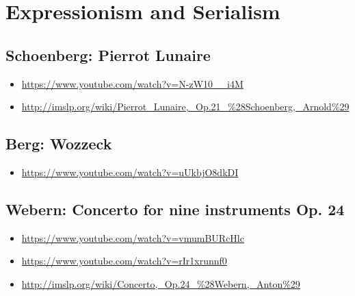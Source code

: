 
\chapter{Expressionism and Serialism}
\label{twentieth}


\section{Schoenberg: Pierrot Lunaire}
\begin{itemize}
\item \url{https://www.youtube.com/watch?v=N-zW10__i4M}
\item \url{http://imslp.org/wiki/Pierrot_Lunaire,_Op.21_%28Schoenberg,_Arnold%29}
\end{itemize}

\section{Berg: Wozzeck}
\begin{itemize}
\item \url{https://www.youtube.com/watch?v=uUkbjO8dkDI}
\end{itemize}

\section{Webern: Concerto for nine instruments Op. 24}

\begin{itemize}
\item \url{https://www.youtube.com/watch?v=vmumBURcHlc}
\item \url{https://www.youtube.com/watch?v=rIr1xrunnf0}
\item \url{http://imslp.org/wiki/Concerto,_Op.24_%28Webern,_Anton%29}
\end{itemize}
